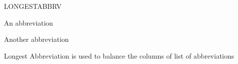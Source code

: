 \begin{theglossary}{LONGESTABBRV}
\item[A] An abbreviation
\item[AA] Another abbreviation
\item[LONGESTABBRV] Longest Abbreviation is used to balance the columns of list of abbreviations
\end{theglossary}
